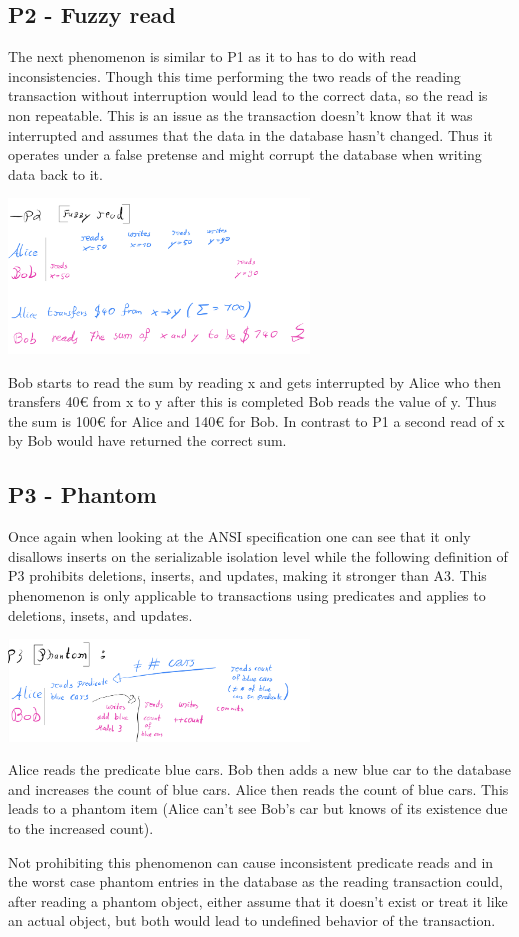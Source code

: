 \documentclass[sigconf, review=true]{acmart}
\begin{document}
\subsection{P2 - Fuzzy read}
The next phenomenon is similar to P1 as it to has to do with read inconsistencies.
Though this time performing the two reads of the reading transaction without interruption would lead
to the correct data, so the read is non repeatable. This is an issue as the transaction doesn't know that
it was interrupted and assumes that the data in the database hasn't changed. Thus it operates under a false pretense
and might corrupt the database when writing data back to it.

\includegraphics[width=8cm]{P2}
\begin{example}
    Bob starts to read the sum by reading x and gets interrupted by Alice who then transfers 40€ from x to y after this is completed Bob reads the value of y.
    Thus the sum is 100€ for Alice and 140€ for Bob.
    In contrast to P1 a second read of x by Bob would have returned the correct sum.
\end{example}
\subsection{P3 - Phantom}
Once again when looking at the ANSI specification one can see that it only disallows inserts on the serializable
isolation level while the following definition of P3 prohibits deletions, inserts, and updates, making it stronger than A3.
This phenomenon is only applicable to transactions using predicates and applies to deletions, insets, and updates.


\includegraphics[width=8cm]{P3}
\begin{example}
    Alice reads the predicate blue cars. Bob then adds a new blue car to the database and increases
    the count of blue cars. Alice then reads the count of blue cars. This leads to a phantom item
    (Alice can’t see Bob's car but knows of its existence due to the increased count).
\end{example}
Not prohibiting this phenomenon can cause inconsistent predicate reads and in the worst case phantom entries in the
database as the reading transaction could, after reading a phantom object, either assume that it doesn't exist or treat it like an actual
object, but both would lead to undefined behavior of the transaction.
\end{document}
